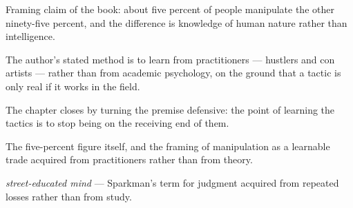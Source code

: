 

\begin{distilled}
  \item Framing claim of the book: about five percent of people manipulate the other ninety-five percent, and the difference is knowledge of human nature rather than intelligence.
  \item The author's stated method is to learn from practitioners --- hustlers and con artists --- rather than from academic psychology, on the ground that a tactic is only real if it works in the field.
  \item The chapter closes by turning the premise defensive: the point of learning the tactics is to stop being on the receiving end of them.
\end{distilled}

\begin{unique}
  \item The five-percent figure itself, and the framing of manipulation as a learnable trade acquired from practitioners rather than from theory.
\end{unique}

\begin{terms}
  \item \emph{street-educated mind} --- Sparkman's term for judgment acquired from repeated losses rather than from study.
\end{terms}
